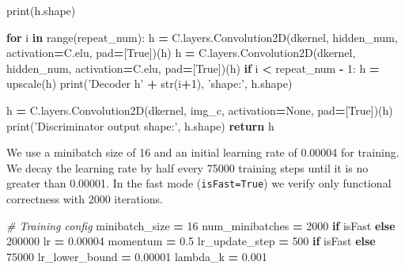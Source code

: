 \documentclass[]{book}
\newenvironment{Shaded}{\begin{snugshade}}{\end{snugshade}}
\newcommand{\KeywordTok}[1]{\textcolor[rgb]{0.13,0.29,0.53}{\textbf{#1}}}
\newcommand{\DecValTok}[1]{\textcolor[rgb]{0.00,0.00,0.81}{#1}}
\newcommand{\FloatTok}[1]{\textcolor[rgb]{0.00,0.00,0.81}{#1}}
\newcommand{\StringTok}[1]{\textcolor[rgb]{0.31,0.60,0.02}{#1}}
\newcommand{\CommentTok}[1]{\textcolor[rgb]{0.56,0.35,0.01}{\textit{#1}}}
\newcommand{\VariableTok}[1]{\textcolor[rgb]{0.00,0.00,0.00}{#1}}
\newcommand{\ControlFlowTok}[1]{\textcolor[rgb]{0.13,0.29,0.53}{\textbf{#1}}}
\newcommand{\OperatorTok}[1]{\textcolor[rgb]{0.81,0.36,0.00}{\textbf{#1}}}
\newcommand{\BuiltInTok}[1]{#1}
\newcommand{\NormalTok}[1]{#1}
\theoremstyle{definition}
\theoremstyle{definition}
\theoremstyle{definition}
\theoremstyle{remark}
\begin{document}
\begin{Shaded}
\begin{Highlighting}[]
    \BuiltInTok{print}\NormalTok{(h.shape)}
    
    \ControlFlowTok{for}\NormalTok{ i }\KeywordTok{in} \BuiltInTok{range}\NormalTok{(repeat_num):}
\NormalTok{        h }\OperatorTok{=}\NormalTok{ C.layers.Convolution2D(dkernel, hidden_num, activation}\OperatorTok{=}\NormalTok{C.elu, pad}\OperatorTok{=}\NormalTok{[}\VariableTok{True}\NormalTok{])(h)}
\NormalTok{        h }\OperatorTok{=}\NormalTok{ C.layers.Convolution2D(dkernel, hidden_num, activation}\OperatorTok{=}\NormalTok{C.elu, pad}\OperatorTok{=}\NormalTok{[}\VariableTok{True}\NormalTok{])(h)}
        \ControlFlowTok{if}\NormalTok{ i }\OperatorTok{<}\NormalTok{ repeat_num }\OperatorTok{-} \DecValTok{1}\NormalTok{:}
\NormalTok{            h }\OperatorTok{=}\NormalTok{ upscale(h)}
        \BuiltInTok{print}\NormalTok{(}\StringTok{'Decoder h'} \OperatorTok{+} \BuiltInTok{str}\NormalTok{(i}\OperatorTok{+}\DecValTok{1}\NormalTok{), }\StringTok{'shape:'}\NormalTok{, h.shape)}
        
\NormalTok{    h }\OperatorTok{=}\NormalTok{ C.layers.Convolution2D(dkernel, img_c, activation}\OperatorTok{=}\VariableTok{None}\NormalTok{, pad}\OperatorTok{=}\NormalTok{[}\VariableTok{True}\NormalTok{])(h)}
    \BuiltInTok{print}\NormalTok{(}\StringTok{'Discriminator output shape:'}\NormalTok{, h.shape)}
    \ControlFlowTok{return}\NormalTok{ h}
\end{Highlighting}
\end{Shaded}

We use a minibatch size of 16 and an initial learning rate of 0.00004
for training. We decay the learning rate by half every 75000 training
steps until it is no greater than 0.00001. In the fast mode
(\texttt{isFast=True}) we verify only functional correctness with 2000
iterations.

\begin{Shaded}
\begin{Highlighting}[]
\CommentTok{# Training config}
\NormalTok{minibatch_size }\OperatorTok{=} \DecValTok{16}
\NormalTok{num_minibatches }\OperatorTok{=} \DecValTok{2000} \ControlFlowTok{if}\NormalTok{ isFast }\ControlFlowTok{else} \DecValTok{200000}
\NormalTok{lr }\OperatorTok{=} \FloatTok{0.00004}
\NormalTok{momentum }\OperatorTok{=} \FloatTok{0.5}
\NormalTok{lr_update_step }\OperatorTok{=} \DecValTok{500} \ControlFlowTok{if}\NormalTok{ isFast }\ControlFlowTok{else} \DecValTok{75000}
\NormalTok{lr_lower_bound }\OperatorTok{=} \FloatTok{0.00001}
\NormalTok{lambda_k }\OperatorTok{=} \FloatTok{0.001}
\end{Highlighting}
\end{Shaded}
\end{document}

